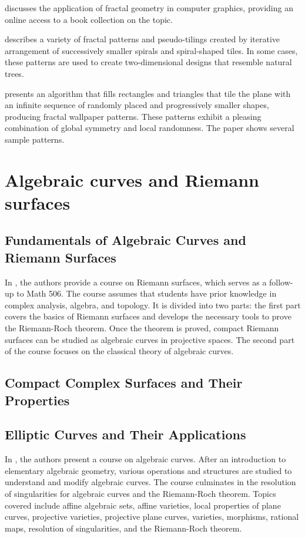 \documentclass{article}
\begin{document}
\cite{Eisenhower2016FractalGA} discusses the application of fractal geometry in computer graphics, providing an online access to a book collection on the topic.

\cite{Fathauer2004FractalPA} describes a variety of fractal patterns and pseudo-tilings created by iterative arrangement of successively smaller spirals and spiral-shaped tiles. In some cases, these patterns are used to create two-dimensional designs that resemble natural trees.

\cite{Shier2015FractalWP} presents an algorithm that fills rectangles and triangles that tile the plane with an infinite sequence of randomly placed and progressively smaller shapes, producing fractal wallpaper patterns. These patterns exhibit a pleasing combination of global symmetry and local randomness. The paper shows several sample patterns.


\section{Algebraic curves and Riemann surfaces}

\subsection{Fundamentals of Algebraic Curves and Riemann Surfaces}

In \cite{Hacking2007RiemannS}, the authors provide a course on Riemann surfaces, which serves as a follow-up to Math 506. The course assumes that students have prior knowledge in complex analysis, algebra, and topology. It is divided into two parts: the first part covers the basics of Riemann surfaces and develops the necessary tools to prove the Riemann-Roch theorem. Once the theorem is proved, compact Riemann surfaces can be studied as algebraic curves in projective spaces. The second part of the course focuses on the classical theory of algebraic curves.

\subsection{Compact Complex Surfaces and Their Properties}

\subsection{Elliptic Curves and Their Applications}

In \cite{Ruddat2020AlgebraicC}, the authors present a course on algebraic curves. After an introduction to elementary algebraic geometry, various operations and structures are studied to understand and modify algebraic curves. The course culminates in the resolution of singularities for algebraic curves and the Riemann-Roch theorem. Topics covered include affine algebraic sets, affine varieties, local properties of plane curves, projective varieties, projective plane curves, varieties, morphisms, rational maps, resolution of singularities, and the Riemann-Roch theorem.
\end{document}
